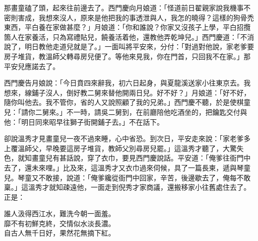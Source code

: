 那畫童磕了頭，起來往前邊去了。西門慶向月娘道：「怪道前日翟親家說我機事不密則害成，我想來沒人，原來是他把我的事透泄與人，我怎的曉得？這樣的狗骨禿東西，平白養在家做甚麼？」月娘道：「你和誰說？你家又沒孩子上學，平白招攬箇人在家養活，只為寫禮貼兒，饒養活着他，還教他弄乾坤兒。」西門慶道：「不消說了，明日教他走道兒就是了。」一面叫將平安來，分付：「對過對他說，家老爹要房子堆貨，教溫師父轉尋房兒便了。等他來見我，你在門首，只回我不在家。」那平安兒應諾去了。

西門慶告月娘說：「今日賁四來辭我，初六日起身，與夏龍溪送家小往東京去。我想來，線鋪子沒人，倒好教二舅來替他開兩日兒。好不好？」月娘道：「好不好，隨你叫他去。我不管你，省的人又說照顧了我的兄弟。」西門慶不聽，於是使棋童兒：「請你二舅來。」不一時，請吳二舅到，在前廳陪他吃酒坐的，把鑰匙交付與他：「明日同來昭早往獅子街開鋪子去。」不在話下。

卻說溫秀才見畫童兒一夜不過來睡，心中省恐。到次日，平安走來說：「家老爹多上覆溫師父，早晚要這房子堆貨，教師父別尋房兒罷。」這溫秀才聽了，大驚失色，就知畫童兒有甚話說，穿了衣巾，要見西門慶說話。平安道：「俺爹往衙門中去了，還未來哩。」比及來，這溫秀才又衣巾過來伺候，具了一篇長柬，{}遞與琴童兒。琴童又不敢接，說道：「俺爹纔從衙門中回家，辛苦，後邊歇去了，俺每不敢稟。」這溫秀才就知疎遠他，一面走到倪秀才家商議，還搬移家小往舊處住去了。正是：

\begin{myquote} 
誰人汲得西江水，難洗今朝一面羞。\\靡不有初鮮克終，交情似水淡長濃。\\自古人無千日好，果然花無摘下紅。
\end{myquote} 

